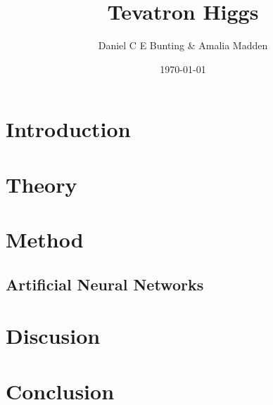 \documentclass{article}
\title{Tevatron Higgs}
\author{ Daniel C E Bunting \& Amalia Madden}
\date{\today}
\begin{document}
\maketitle
\begin{abstract}
\end{abstract}

\section{Introduction} %
\label{sec:introduction}


\section{Theory} %
\label{sec:theory}





\section{Method} %
\label{sec:method}
\subsection{Artificial Neural Networks} %

\label{sub:artificial_neural_networks}




\section{Discusion} %
\label{sec:discusion}


\section{Conclusion} %
\label{sec:conclusion}






 

\clearpage
\end{document}
